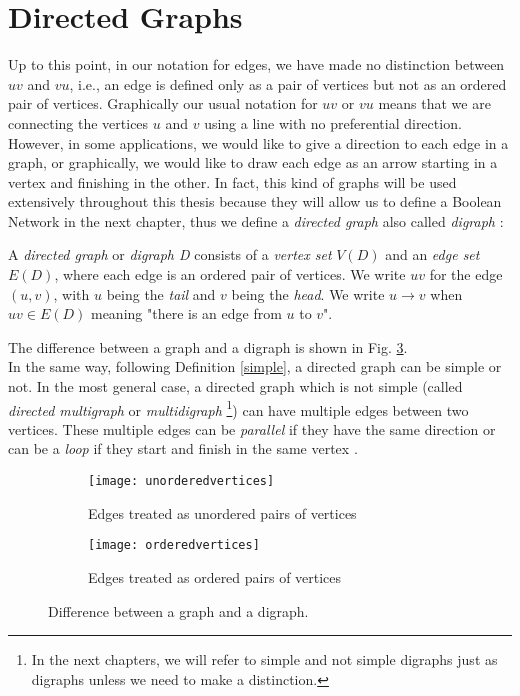 \section{Directed Graphs}
\label{digraph}
Up to this point, in our notation for edges, we have made no distinction between $uv$ and $vu$, i.e., an edge is defined only as a pair of vertices but not as an ordered pair of vertices. Graphically our usual notation for $uv$ or $vu$ means that we are connecting the vertices $u$ and $v$ using a line with no preferential direction. However, in some applications, we would like to give a direction to each edge in a graph, or graphically, we would like to draw each edge as an arrow starting in a vertex and finishing in the other. In fact, this kind of graphs will be used extensively throughout this thesis because they will allow us to define a Boolean Network in the next chapter, thus we define a \textit{directed graph} also called \textit{digraph} \cite{douglas}:\\

\begin{defn}
	A \textit{directed graph} or \textit{digraph D} consists of a \textit{vertex set} $ V(D) $ and an \textit{edge set} $ E(D) $, where each edge is an ordered pair of vertices. We write $ uv $ for the edge $ (u,v) $, with $ u $ being the \textit{tail} and $ v $ being the \textit{head}. We write $u \rightarrow v$ when $ uv \in E(D) $ meaning "there is an edge from $ u $ to $ v $".\\
\end{defn}

The difference between a graph and a digraph is shown in Fig. \ref{fig:directedvsnotdirected}.\\
In the same way, following Definition \ref{simple}, a directed graph can be simple or not. In the most general case, a directed graph which is not simple (called \textit{directed multigraph} or \textit{multidigraph} \footnote{In the next chapters, we will refer to simple and not simple digraphs just as digraphs unless we need to make a distinction.}) can have multiple edges between two vertices. These multiple edges can be \textit{parallel} if they have the same direction or can be a \textit{loop} if they start and finish in the same vertex \cite{diestel}.\\

\begin{figure}
	\centering
	\begin{subfigure}[b]{0.32\textwidth}
		\centering
		\texttt{[image: unorderedvertices]}
		\caption{Edges treated as unordered pairs of vertices}
		\label{fig:unorderedvertices}
	\end{subfigure}
	\hfill
	\begin{subfigure}[b]{0.4\textwidth}
		\centering
		\texttt{[image: orderedvertices]}
		\caption{Edges treated as ordered pairs of vertices}
		\label{fig:orderedvertices}
	\end{subfigure}
	\caption{Difference between a graph and a digraph.}
	\label{fig:directedvsnotdirected}
\end{figure}

